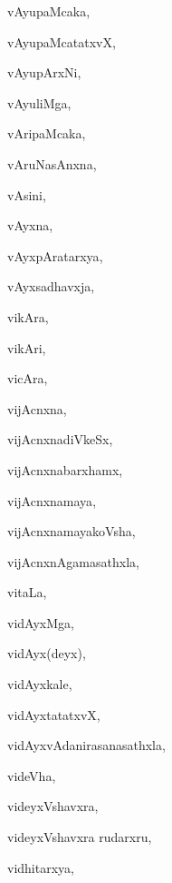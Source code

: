 \begin{multicols}{3}
{\noindent
{vAyupaMcaka}, \pageref{vAyupaMcaka}

\noindent
{vAyupaMcatatxvX}, \pageref{vAyupaMcatatxvX}

\noindent
{vAyupArxNi}, \pageref{vAyupArxNi}

\noindent
{vAyuliMga}, \pageref{vAyuliMga}

\noindent
{vAripaMcaka}, \pageref{vAripaMcaka}

\noindent
{vAruNasAnxna}, \pageref{vAruNasAnxna}

\noindent
{vAsini}, \pageref{vAsini}

\noindent
{vAyxna}, \pageref{vAyxna}

\noindent
{vAyxpAratarxya}, \pageref{vAyxpAratarxya}

\noindent
{vAyxsadhavxja}, \pageref{vAyxsadhavxja}

\noindent
{vikAra}, \pageref{vikAra}

\noindent
{vikAri}, \pageref{vikAri}

\noindent
{vicAra}, \pageref{vicAra}

\noindent
{vijAcnxna}, \pageref{vijAcnxna}

\noindent
{vijAcnxnadiVkeSx}, \pageref{vijAcnxnadiVkeSx}

\noindent
{vijAcnxnabarxhamx}, \pageref{vijAcnxnabarxhamx}

\noindent
{vijAcnxnamaya}, \pageref{vijAcnxnamaya}

\noindent
{vijAcnxnamayakoVsha}, \pageref{vijAcnxnamayakoVsha}

\noindent
{vijAcnxnAgamasathxla}, \pageref{vijAcnxnAgamasathxla}

\noindent
{vitaLa}, \pageref{vitaLa}

\noindent
{vidAyxMga}, \pageref{vidAyxMga}

\noindent
{vidAyx(deyx)}, \pageref{vidAyxdeyx}

\noindent
{vidAyxkale}, \pageref{vidAyxkale}

\noindent
{vidAyxtatatxvX}, \pageref{vidAyxtatatxvX}

\noindent
{vidAyxvAdanirasanasathxla}, \pageref{vidAyxvAdanirasanasathxla}

\noindent
{videVha}, \pageref{videVha}

\noindent
{videyxVshavxra}, \pageref{videyxVshavxra}

\noindent
{videyxVshavxra rudarxru}, \pageref{videyxVshavxrarudarxru}

\noindent
{vidhitarxya}, \pageref{vidhitarxya}

}
\end{multicols}
